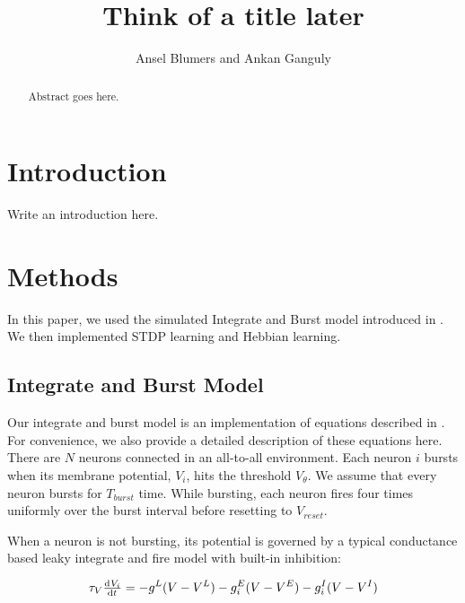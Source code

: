 \documentclass[12pt, final]{article}
\begin{document}
\newcommand{\Pois}{\text{Pois}}

\newtheorem{prop}{Proposition}


\title{Think of a title later}
\author{Ansel Blumers and Ankan Ganguly}
\maketitle

\begin{abstract}
Abstract goes here.
\end{abstract}

\newpage

\tableofcontents

\newpage

\section{Introduction}

Write an introduction here.

\section{Methods}

In this paper, we used the simulated Integrate and Burst model introduced in \cite{Fiete}. We then implemented STDP learning and Hebbian learning.

\subsection{Integrate and Burst Model}

Our integrate and burst model is an implementation of equations described in \cite{Fiete}. For convenience, we also provide a detailed description of these equations here. There are \(N\) neurons connected in an all-to-all environment. Each neuron \(i\) bursts when its membrane potential, \(V_i\), hits the threshold \(V_\theta\). We assume that every neuron bursts for \(T_{burst}\) time. While bursting, each neuron fires four times uniformly over the burst interval before resetting to \(V_{reset}\).

When a neuron is not bursting, its potential is governed by a typical conductance based leaky integrate and fire model with built-in inhibition:

\begin{equation}
\tau_V \od{V_i}{t} = -g^L(V - V^L) - g^E_i(V - V^E) - g^I_i(V - V^I)
\label{Potential}
\end{equation}
\end{document}
